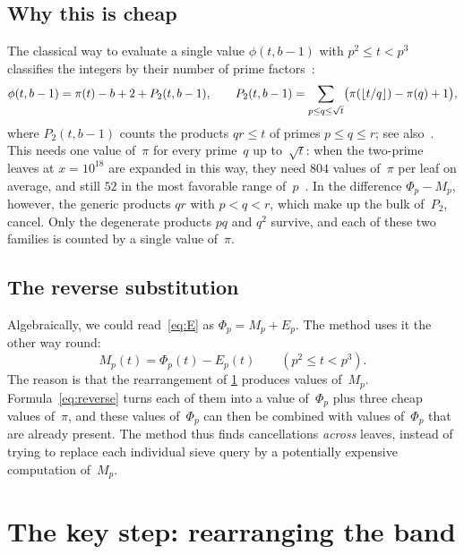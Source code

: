 \documentclass[11pt,a4paper]{amsart}
\numberwithin{equation}{section}
\DeclarePairedDelimiter{\floor}{\lfloor}{\rfloor}
\begin{document}
\subsection{Why this is cheap}
The classical way to evaluate a single value $\phi(t,b-1)$ with $p^2\le t<p^3$
classifies the integers by their number of prime
factors~\cite{LMO1985,Lehmer1959}:
\[
  \phi(t,b-1)=\pi(t)-b+2+P_2(t,b-1),\qquad
  P_2(t,b-1)=\sum_{p\le q\le\sqrt t}\bigl(\pi(\floor{t/q})-\pi(q)+1\bigr),
\]
where $P_2(t,b-1)$ counts the products $qr\le t$ of primes $p\le q\le r$; see
also~\cite[\S4]{Walisch2025phi}. This needs one value of~$\pi$ for every
prime~$q$ up to~$\sqrt t$: when the two-prime leaves at $x=10^{18}$ are
expanded in this way, they need $804$ values of~$\pi$ per leaf on average, and
still $52$ in the most favorable range of~$p$~\cite[\S6]{Lin2026}. In the
difference $\Phi_p-M_p$, however, the generic products $qr$ with $p<q<r$, which
make up the bulk of~$P_2$, cancel. Only the degenerate products $pq$ and $q^2$
survive, and each of these two families is counted by a single value of~$\pi$.

\subsection{The reverse substitution}
Algebraically, we could read~\eqref{eq:E} as $\Phi_p=M_p+E_p$. The method uses
it the other way round:
\begin{equation}\label{eq:reverse}
  \boxed{\;M_p(t)=\Phi_p(t)-E_p(t)\qquad(p^2\le t<p^3).\;}
\end{equation}
The reason is that the rearrangement of \cref{sec:band} produces values
of~$M_p$. Formula~\eqref{eq:reverse} turns each of them into a value
of~$\Phi_p$ plus three cheap values of~$\pi$, and these values of~$\Phi_p$
can then be combined with values of~$\Phi_p$ that are already present. The
method thus finds cancellations \emph{across} leaves, instead of trying to
replace each individual sieve query by a potentially expensive computation
of~$M_p$.

\section{The key step: rearranging the band}\label{sec:band}
\end{document}
